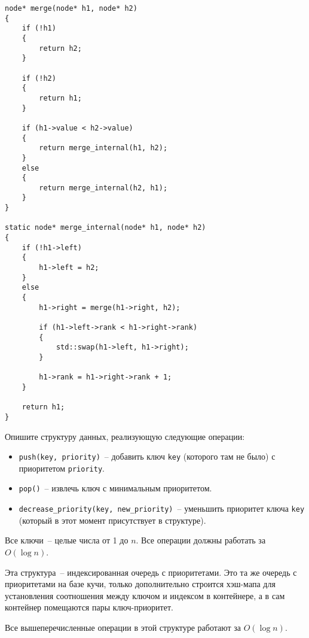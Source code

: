 \begin{solution}
    \medskip\noindent

    \begin{lstlisting}
node* merge(node* h1, node* h2)
{
    if (!h1)
    {
        return h2;
    }

    if (!h2)
    {
        return h1;
    }

    if (h1->value < h2->value)
    {
        return merge_internal(h1, h2);
    }
    else
    {
        return merge_internal(h2, h1);
    }
}

static node* merge_internal(node* h1, node* h2)
{
    if (!h1->left)
    {
        h1->left = h2;
    }
    else
    {
        h1->right = merge(h1->right, h2);

        if (h1->left->rank < h1->right->rank)
        {
            std::swap(h1->left, h1->right);
        }

        h1->rank = h1->right->rank + 1;
    }

    return h1;
}
    \end{lstlisting}
\end{solution}


\begin{problem}
    Опишите структуру данных, реализующую следующие операции:
    \begin{itemize}
        \item \texttt{push(key, priority)}~-- добавить ключ \texttt{key} (которого там не было) с приоритетом \texttt{priority}.
        \item \texttt{pop()}~-- извлечь ключ с минимальным приоритетом.
        \item \texttt{decrease\_priority(key, new\_priority)}~-- уменьшить приоритет ключа \texttt{key} (который в этот момент присутствует в структуре).
    \end{itemize}
    Все ключи~-- целые числа от 1 до $n$. Все операции должны работать за $O(\log{n})$.
\end{problem}

\begin{solution}
    \medskip\noindent

    Эта структура~-- индексированная очередь с приоритетами. Это та же очередь с приоритетами на базе кучи,
    только дополнительно строится хэш-мапа для установления соотношения между ключом и индексом в контейнере,
    а в сам контейнер помещаются пары ключ-приоритет.

    Все вышеперечисленные операции в этой структуре работают за $O(\log{n})$.
\end{solution}


